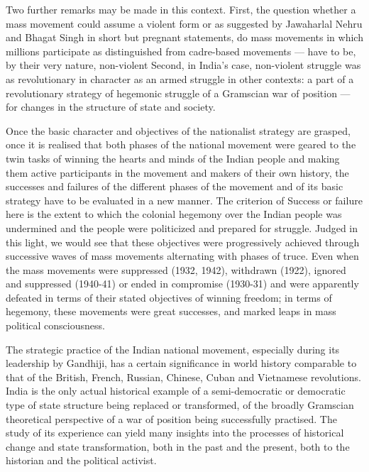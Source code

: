 Two further remarks may be made in this context. First, the question whether a mass movement could assume a violent form or as suggested by Jawaharlal Nehru and Bhagat Singh in short but pregnant statements, do mass movements in which millions participate as distinguished from cadre-based movements — have to be, by their very nature, non-violent Second, in India's case, non-violent struggle was as revolutionary in character as an armed struggle in other contexts: a part of a revolutionary strategy of hegemonic struggle of a Gramscian war of position — for changes in the structure of state and society.

Once the basic character and objectives of the nationalist strategy are grasped, once it is realised that both phases of the national movement were geared to the twin tasks of winning the hearts and minds of the Indian people and making them active participants in the movement and makers of their own history, the successes and failures of the different phases of the movement and of its basic strategy have to be evaluated in a new manner. The criterion of Success or failure here is the extent to which the colonial hegemony over the Indian people was undermined and the people were politicized and prepared for struggle. Judged in this light, we would see that these objectives were progressively achieved through successive waves of mass movements alternating with phases of truce. Even when the mass movements were suppressed (1932, 1942), withdrawn (1922), ignored and suppressed (1940-41) or ended in compromise (1930-31) and were apparently defeated in terms of their stated objectives of winning freedom; in terms of hegemony, these movements were great successes, and marked leaps in mass political consciousness.

The strategic practice of the Indian national movement, especially during its leadership by Gandhiji, has a certain significance in world history comparable to that of the British, French, Russian, Chinese, Cuban and Vietnamese revolutions. India is the only actual historical example of a semi-democratic or democratic type of state structure being replaced or transformed, of the broadly Gramscian theoretical perspective of a war of position being successfully practised. The study of its experience can yield many insights into the processes of historical change and state transformation, both in the past and the present, both to the historian and the political activist.

